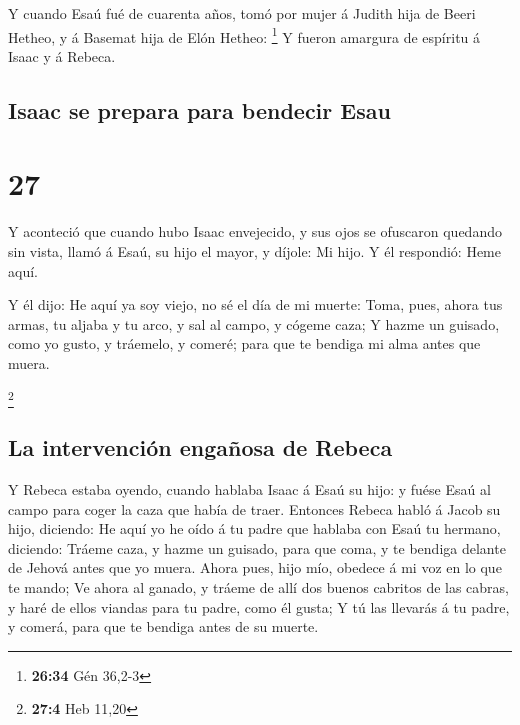 Y cuando Esaú fué de cuarenta años, tomó por mujer á
Judith hija de Beeri Hetheo, y á Basemat hija de Elón Hetheo:
\footnote{\textbf{26:34} Gén 36,2-3}  Y fueron amargura
de espíritu á Isaac y á Rebeca.

\hypertarget{isaac-se-prepara-para-bendecir-esau}{%
\subsection{Isaac se prepara para bendecir
Esau}\label{isaac-se-prepara-para-bendecir-esau}}

\hypertarget{section-26}{%
\section{27}\label{section-26}}

 Y aconteció que cuando hubo Isaac envejecido, y sus ojos
se ofuscaron quedando sin vista, llamó á Esaú, su hijo el mayor, y
díjole: Mi hijo. Y él respondió: Heme aquí.

 Y él dijo: He aquí ya soy viejo, no sé el día de mi
muerte:  Toma, pues, ahora tus armas, tu aljaba y tu arco,
y sal al campo, y cógeme caza;  Y hazme un guisado, como
yo gusto, y tráemelo, y comeré; para que te bendiga mi alma antes que
muera.

\footnote{\textbf{27:4} Heb 11,20}

\hypertarget{la-intervenciuxf3n-engauxf1osa-de-rebeca}{%
\subsection{La intervención engañosa de
Rebeca}\label{la-intervenciuxf3n-engauxf1osa-de-rebeca}}

 Y Rebeca estaba oyendo, cuando hablaba Isaac á Esaú su
hijo: y fuése Esaú al campo para coger la caza que había de traer.
 Entonces Rebeca habló á Jacob su hijo, diciendo: He aquí
yo he oído á tu padre que hablaba con Esaú tu hermano, diciendo:
 Tráeme caza, y hazme un guisado, para que coma, y te
bendiga delante de Jehová antes que yo muera.  Ahora pues,
hijo mío, obedece á mi voz en lo que te mando;  Ve ahora
al ganado, y tráeme de allí dos buenos cabritos de las cabras, y haré de
ellos viandas para tu padre, como él gusta;  Y tú las
llevarás á tu padre, y comerá, para que te bendiga antes de su muerte.

